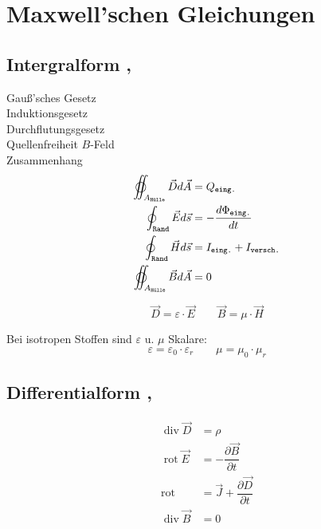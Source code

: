 \section{Maxwell’schen Gleichungen}

\subsection{Intergralform , }
Gauß'sches Gesetz\\
Induktionsgesetz\\
Durchflutungsgesetz\\
Quellenfreiheit $B$-Feld\\
Zusammenhang
\begin{align*}
    \varoiint_{A_\texttt{Hülle}} \vec{D} d \vec{A} & = Q_\texttt{eing.}                      \\
    \oint_\texttt{Rand} \vec{E} d \vec{s}          & = -\dfrac{d\Phi_\texttt{eing.}}{dt}     \\
    \oint_\texttt{Rand} \vec{H} d \vec{s}          & = I_\texttt{eing.} + I_\texttt{versch.} \\
    \varoiint_{A_\texttt{Hülle}} \vec{B} d \vec{A} & = 0
\end{align*}

\[
    \vec{D} = \varepsilon \cdot \vec{E} \qquad
    \vec{B} = \mu \cdot \vec{H}
\]

Bei isotropen Stoffen sind $\varepsilon$ u. $\mu$ Skalare:
\[
    \varepsilon = \varepsilon_0 \cdot \varepsilon_r \qquad \mu = \mu_0 \cdot \mu_r
\]

\subsection{Differentialform , }
\begin{align*}
    \operatorname{div} \vec{D} &= \rho\\
    \operatorname{rot} \vec{E} &= -\dfrac{\partial \vec{B}}{\partial t}\\
    \operatorname{rot} &= \vec{J} + \dfrac{\partial \vec{D}}{\partial t} \\
    \operatorname{div} \vec{B} &= 0
\end{align*}

